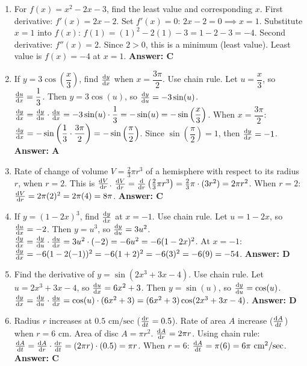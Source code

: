 \begin{enumerate}[label={\arabic*.}]
  \item For \(f(x) = x^2 - 2x - 3\), find the least value and corresponding \(x\).
    First derivative: \(f'(x) = 2x - 2\).
    Set \(f'(x) = 0\): \(2x - 2 = 0 \implies x = 1\).
    Substitute \(x=1\) into \(f(x)\): \(f(1) = (1)^2 - 2(1) - 3 = 1 - 2 - 3 = -4\).
    Second derivative: \(f''(x) = 2\). Since \(2 > 0\), this is a minimum (least value).
    Least value is \(f(x) = -4\) at \(x=1\).
    \textbf{Answer: C}

  \item If \(y = 3 \cos\left(\dfrac{x}{3}\right)\), find \(\frac{\mathrm{d}y}{\mathrm{d}x}\) when \(x = \dfrac{3\pi}{2}\).
    Use chain rule. Let \(u = \dfrac{x}{3}\), so \(\frac{\mathrm{d}u}{\mathrm{d}x} = \dfrac{1}{3}\).
    Then \(y = 3\cos(u)\), so \(\frac{\mathrm{d}y}{\mathrm{d}u} = -3\sin(u)\).
    \(\frac{\mathrm{d}y}{\mathrm{d}x} = \frac{\mathrm{d}y}{\mathrm{d}u} \cdot \frac{\mathrm{d}u}{\mathrm{d}x} = -3\sin(u) \cdot \dfrac{1}{3} = -\sin(u) = -\sin\left(\dfrac{x}{3}\right)\).
    When \(x = \dfrac{3\pi}{2}\):
    \(\frac{\mathrm{d}y}{\mathrm{d}x} = -\sin\left(\dfrac{1}{3} \cdot \dfrac{3\pi}{2}\right) = -\sin\left(\dfrac{\pi}{2}\right)\).
    Since \(\sin\left(\dfrac{\pi}{2}\right) = 1\), then \(\frac{\mathrm{d}y}{\mathrm{d}x} = -1\).
    \textbf{Answer: A}

  \item Rate of change of volume \(V = \frac{2}{3}\pi r^3\) of a hemisphere with respect to its radius \(r\), when \(r=2\). This is \(\frac{\mathrm{d}V}{\mathrm{d}r}\).
    \(\frac{\mathrm{d}V}{\mathrm{d}r} = \frac{\mathrm{d}}{\mathrm{d}r}\left(\frac{2}{3}\pi r^3\right) = \frac{2}{3}\pi \cdot (3r^2) = 2\pi r^2\).
    When \(r=2\): \(\frac{\mathrm{d}V}{\mathrm{d}r} = 2\pi (2)^2 = 2\pi(4) = 8\pi\).
    \textbf{Answer: C}

  \item If \(y = (1-2x)^3\), find \(\frac{\mathrm{d}y}{\mathrm{d}x}\) at \(x = -1\).
    Use chain rule. Let \(u = 1-2x\), so \(\frac{\mathrm{d}u}{\mathrm{d}x} = -2\).
    Then \(y = u^3\), so \(\frac{\mathrm{d}y}{\mathrm{d}u} = 3u^2\).
    \(\frac{\mathrm{d}y}{\mathrm{d}x} = \frac{\mathrm{d}y}{\mathrm{d}u} \cdot \frac{\mathrm{d}u}{\mathrm{d}x} = 3u^2 \cdot (-2) = -6u^2 = -6(1-2x)^2\).
    At \(x = -1\):
    \(\frac{\mathrm{d}y}{\mathrm{d}x} = -6(1-2(-1))^2 = -6(1+2)^2 = -6(3)^2 = -6(9) = -54\).
    \textbf{Answer: D}

  \item Find the derivative of \(y = \sin(2x^3+3x-4)\).
    Use chain rule. Let \(u = 2x^3+3x-4\), so \(\frac{\mathrm{d}u}{\mathrm{d}x} = 6x^2+3\).
    Then \(y = \sin(u)\), so \(\frac{\mathrm{d}y}{\mathrm{d}u} = \cos(u)\).
    \(\frac{\mathrm{d}y}{\mathrm{d}x} = \frac{\mathrm{d}y}{\mathrm{d}u} \cdot \frac{\mathrm{d}u}{\mathrm{d}x} = \cos(u) \cdot (6x^2+3) = (6x^2+3)\cos(2x^3+3x-4)\).
    \textbf{Answer: D}

  \item Radius \(r\) increases at \(0.5 \text{ cm/sec}\) (\(\frac{\mathrm{d}r}{\mathrm{d}t} = 0.5\)). Rate of area \(A\) increase (\(\frac{\mathrm{d}A}{\mathrm{d}t}\)) when \(r=6 \text{ cm}\). Area of disc \(A = \pi r^2\).
    \(\frac{\mathrm{d}A}{\mathrm{d}r} = 2\pi r\).
    Using chain rule: \(\frac{\mathrm{d}A}{\mathrm{d}t} = \frac{\mathrm{d}A}{\mathrm{d}r} \cdot \frac{\mathrm{d}r}{\mathrm{d}t} = (2\pi r) \cdot (0.5) = \pi r\).
    When \(r=6\): \(\frac{\mathrm{d}A}{\mathrm{d}t} = \pi (6) = 6\pi \text{ cm}^2/\text{sec}\).
    \textbf{Answer: C}


\end{enumerate}
